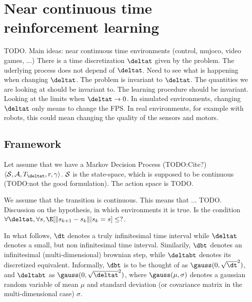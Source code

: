 \section{Near continuous time reinforcement learning}
\label{sec:continous}
TODO. Main ideas: near continuous time environments (control, mujoco, video games, ...)
There is a time discretization $\deltat$ given by the problem. The uderlying process does not depend of $\deltat$. Need to see what is happening when changing $\deltat$. The problem is invariant to $\deltat$. The quantities we are looking at should be invariant to. The learning procedure should be invariant. Looking at the limits when $\deltat \rightarrow 0$. In simulated environments, changing $\deltat$ only means to change the FPS. In real environments, for example with robots, this could mean changing the quality of the sensors and motors.

\subsection{Framework}

Let assume that we have a Markov Decision Process (TODO:Cite?) $\langle {\cal S}, {\cal A}, T_{\deltat}, r, \gamma\rangle$. ${\cal S}$ is the state-space, which is supposed to be continuous (TODO:not the good formulation). The action space is TODO.

We assume that the transition is continuous. This means that ... TODO. Discussion on the hypothesis, in which environments it is true. Is the condition $\forall \deltat, \forall s, \E[\|s_{k+1} - s_k \||s_k = s] \leq ?$. 

In what follows, $\dt$ denotes a truly infinitesimal time interval while $\deltat$
denotes a small, but non infinitesimal time interval. Similarily, $\dbt$ denotes
an infinitesimal (multi-dimensional) brownian step, while $\deltabt$ denotes its
discretized equivalent. Informally, $\dbt$ is to be thought of as $\gauss(0, \sqrt{\dt}^2)$,
and $\deltabt$ as $\gauss(0, \sqrt{\deltat}^2)$, where $\gauss(\mu, \sigma)$ denotes a gaussian
random variable of mean $\mu$ and standard deviation (or covariance matrix in the multi-dimensional case)
$\sigma$.

